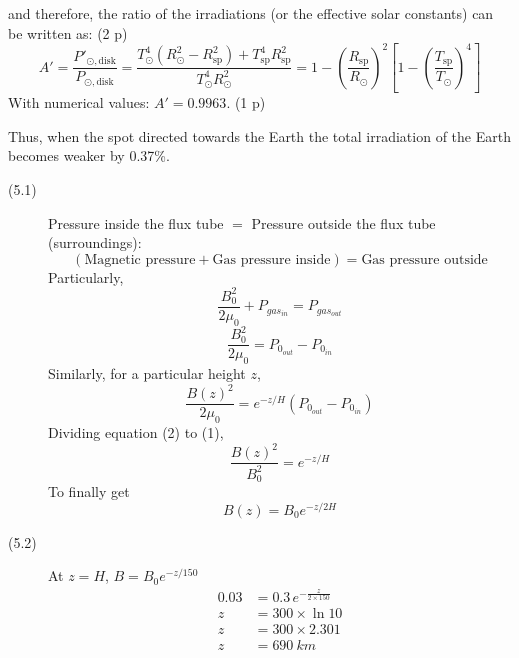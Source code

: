 \begin{description}
  and therefore, the ratio of the irradiations (or the effective solar
  constants) can be written as: \hfill(2 p)
  \begin{equation*}
  A' = \frac{P'_{\odot,\mathrm{disk}}}{P_{\odot,\mathrm{disk}}}
     = \frac{T_\odot^4(R_\odot^2 - R_{\mathrm{sp}}^2)
       + T_{\mathrm{sp}}^4 R_{\mathrm{sp}}^2}{T_\odot^4 R_\odot^2}
     = 1 - \left(\frac{R_{\mathrm{sp}}}{R_\odot}\right)^2
       \left[1 - \left(\frac{T_{\mathrm{sp}}}{T_\odot}\right)^4\right] \tag{7.9}
  \end{equation*}
  With numerical values: $A' = 0.9963$. \hfill(1 p)

  Thus, when the spot directed towards the Earth the total irradiation of the
  Earth becomes weaker by 0.37\%.
\end{description}

\begin{description}
\item[(5.1)] Pressure inside the flux tube $=$ Pressure outside the flux tube
  (surroundings):
  \[
  (\text{Magnetic pressure} + \text{Gas pressure inside}) = \text{Gas pressure outside}
  \]
  Particularly,
  \begin{equation*}
  \frac{B_0^2}{2\mu_0} + P_{gas_{in}} = P_{gas_{out}} \tag*{[2 points]}
  \end{equation*}
  \begin{equation*}
  \frac{B_0^2}{2\mu_0} = P_{0_{out}} - P_{0_{in}} \tag*{Eq.~(1)}
  \end{equation*}
  Similarly, for a particular height $z$,
  \begin{equation*}
  \frac{B(z)^2}{2\mu_0} = e^{-z/H}\left(P_{0_{out}} - P_{0_{in}}\right) \tag*{Eq.~(2)\quad[2 points]}
  \end{equation*}
  Dividing equation (2) to (1),
  \[
  \frac{B(z)^2}{B_0^2} = e^{-z/H}
  \]
  To finally get
  \begin{equation*}
  B(z) = B_0 e^{-z/2H} \tag*{[3 points]}
  \end{equation*}
\item[(5.2)] At $z = H$, $B = B_0 e^{-z/150}$
  \begin{align*}
  0.03 &= 0.3\, e^{-\frac{z}{2\times150}}\\
  z &= 300 \times \ln 10\\
  z &= 300 \times 2.301\\
  z &= 690~km \tag*{[3 points]}
  \end{align*}
\end{description}

